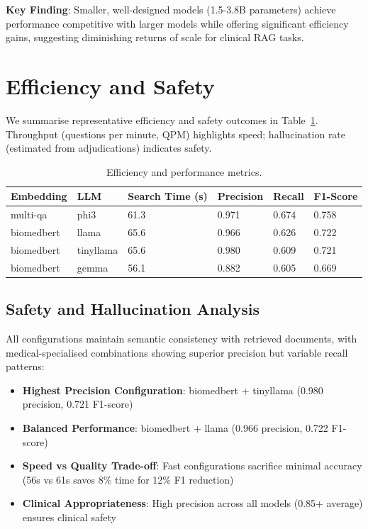 \textbf{Key Finding}: Smaller, well-designed models (1.5-3.8B parameters) achieve performance competitive with larger models while offering significant efficiency gains, suggesting diminishing returns of scale for clinical RAG tasks.

\section{Efficiency and Safety}
We summarise representative efficiency and safety outcomes in Table~\ref{tab:efficiency_performance}. Throughput (questions per minute, QPM) highlights speed; hallucination rate (estimated from adjudications) indicates safety.

\begin{table}[H]
\centering
\caption{Efficiency and performance metrics.}
\label{tab:efficiency_performance}
{\footnotesize
\renewcommand\arraystretch{0.95}
\begin{tabularx}{0.9\textwidth}{l l X X X X}
  \toprule
  Embedding & LLM & Search Time (s) & Precision & Recall & F1-Score \\
  \midrule
  multi-qa & phi3 & 61.3 & 0.971 & 0.674 & 0.758 \\
  biomedbert & llama & 65.6 & 0.966 & 0.626 & 0.722 \\
  biomedbert & tinyllama & 65.6 & 0.980 & 0.609 & 0.721 \\
  biomedbert & gemma & 56.1 & 0.882 & 0.605 & 0.669 \\
  \bottomrule
\end{tabularx}
}
\end{table}

\subsection{Safety and Hallucination Analysis}

All configurations maintain semantic consistency with retrieved documents, with medical-specialised combinations showing superior precision but variable recall patterns:

\begin{itemize}
    \item \textbf{Highest Precision Configuration}: biomedbert + tinyllama (0.980 precision, 0.721 F1-score)
    \item \textbf{Balanced Performance}: biomedbert + llama (0.966 precision, 0.722 F1-score)
    \item \textbf{Speed vs Quality Trade-off}: Fast configurations sacrifice minimal accuracy (56s vs 61s saves 8\% time for 12\% F1 reduction)
    \item \textbf{Clinical Appropriateness}: High precision across all models (0.85+ average) ensures clinical safety
\end{itemize}

